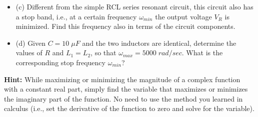 \begin{enumerate}
\begin{itemize}
  \item (c) Different from the simple RCL series resonant circuit, this 
    circuit also has a stop band, i.e., at a certain frequency $\omega_{min}$
    the output voltage $V_R$ is minimized. Find this frequency also in terms
    of the circuit components. 

  \item (d) Given $C=10\;\mu F$ and the two inductors are identical, 
    determine the values of $R$ and $L_1=L_2$, so that $\omega_{max}=5000
    \;rad/sec$. What is the corresponding stop frequency $\omega_{min}$?
  \end{itemize}

  {\bf Hint:} While maximizing or minimizing the magnitude of a complex 
  function with a constant real part, simply find the variable that maximizes
  or minimizes the imaginary part of the function. No need to use the method 
  you learned in calculus (i.e., set the derivative of the function to zero
  and solve for the variable).


  \begin{comment}

  {\bf Solution:}
  \begin{itemize}
  \item Find total impedance of the circuit:
  \begin{eqnarray}
   Z&=&R+j\omega L_2+\frac{j\omega L_1/j\omega C}{j\omega L_1+1/j\omega C}
  	=R+j\omega L_2+\frac{j\omega L_1}{1-\omega^2 CL_1}
  	\nonumber \\
  &=&R+\frac{j\omega(L_2(1-\omega^2CL_1)+L_1)}{1-\omega^2 CL_1}
  =R+j\omega \frac{L_1+L_2-\omega^2CL_1L_2}{1-\omega^2CL_1}
  	\nonumber 
  \end{eqnarray}
  \item At the resonant frequency $\omega_0=\omega_{max}$, the imaginary 
  part of the impedance is zero (minimum), i.e.,
  \[	L_1+L_2=\omega^2CL_1L_2,\;\;\;\;\mbox{i.e.}\;\;\;\;
  	\omega_0=\frac{1}{\sqrt{CL}},\;\;\;\mbox{where}\;\;\;
  	L=\frac{L_1L_2}{L_1+L_2}
  \]
  \item At the stop frequency $\omega_{min}$, the imaginary part of the 
  impedance is infinity (maximum), i.e.,
  \[	1-\omega^2CL_1=0, \;\;\;\mbox{i.e.}\;\;\;\;
  	\omega_{min}=\frac{1}{\sqrt{CL_1}}	\]
  
  \item As $L_1=L_2$, $L=L_1/2$ and we have
  \[ \omega_0=\frac{1}{\sqrt{CL_1/2}}=5000,\;\;\;\;\mbox{i.e.}\;\;\;\;
  	L_1=0.008\;H=8\;mH	\]
  \[ \omega_{min}=\frac{1}{\sqrt{CL_1}}=3536\;rad/sec	\]
  This is true for any load of $R$.
  
  \end{itemize} 

  \end{comment}

\end{enumerate}



